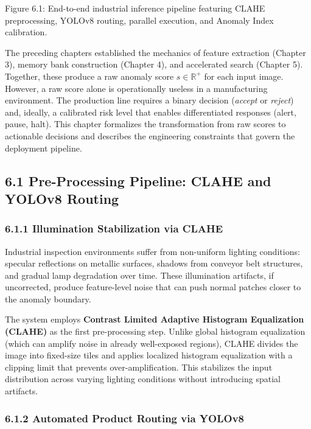 \documentclass[12pt, a4paper, oneside]{report}
\begin{document}
Figure 6.1: End-to-end industrial inference pipeline featuring CLAHE preprocessing, YOLOv8 routing, parallel execution, and Anomaly Index calibration.

The preceding chapters established the mechanics of feature extraction (Chapter 3), memory bank construction (Chapter 4), and accelerated search (Chapter 5). Together, these produce a raw anomaly score \(s \in \mathbb{R}^+\) for each input image. However, a raw score alone is operationally useless in a manufacturing environment. The production line requires a binary decision (\emph{accept} or \emph{reject}) and, ideally, a calibrated risk level that enables differentiated responses (alert, pause, halt). This chapter formalizes the transformation from raw scores to actionable decisions and describes the engineering constraints that govern the deployment pipeline.

\bigskip\noindent\hrulefill\bigskip

\subsection{6.1 Pre-Processing Pipeline: CLAHE and YOLOv8 Routing}\label{pre-processing-pipeline-clahe-and-yolov8-routing}

\subsubsection{6.1.1 Illumination Stabilization via CLAHE}\label{illumination-stabilization-via-clahe}

Industrial inspection environments suffer from non-uniform lighting conditions: specular reflections on metallic surfaces, shadows from conveyor belt structures, and gradual lamp degradation over time. These illumination artifacts, if uncorrected, produce feature-level noise that can push normal patches closer to the anomaly boundary.

The system employs \textbf{Contrast Limited Adaptive Histogram Equalization (CLAHE)} as the first pre-processing step. Unlike global histogram equalization (which can amplify noise in already well-exposed regions), CLAHE divides the image into fixed-size tiles and applies localized histogram equalization with a clipping limit that prevents over-amplification. This stabilizes the input distribution across varying lighting conditions without introducing spatial artifacts.

\subsubsection{6.1.2 Automated Product Routing via YOLOv8}\label{automated-product-routing-via-yolov8}
\end{document}
